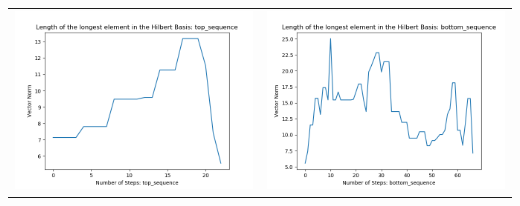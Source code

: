 \documentclass[10pt]{article}
\begin{document}
\begin{tabular}{c|c}
\begin{minipage}{.4\textwidth}
\includegraphics[width=\textwidth]{"DATA/5d/5 generators 2 bound D/top_sequence LENGTH"}
\end{minipage} &
\begin{minipage}{.4\textwidth}
\includegraphics[width=\textwidth]{"DATA/5d/5 generators 2 bound D bottomup/bottom_sequence LENGTH"}
\end{minipage}
\end{tabular}
\end{document}
